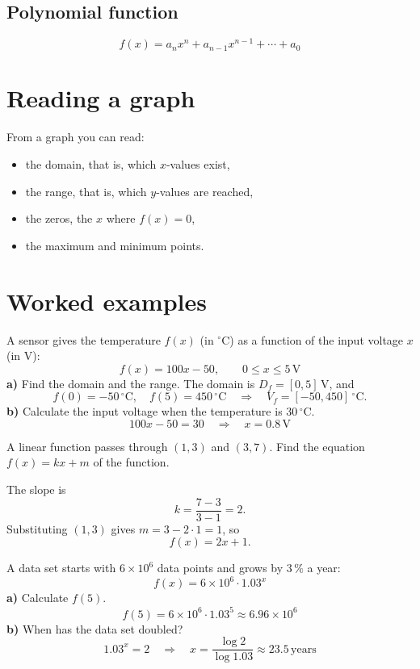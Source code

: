 \subsection{Polynomial function}
\label{c8:sec:polynom}
\[
  f(x) = a_n x^n + a_{n-1} x^{n-1} + \cdots + a_0
\]

\section{Reading a graph}
\label{c8:sec:graf}
From a graph you can read:
\begin{itemize}
  \item the domain, that is, which $x$-values exist,
  \item the range, that is, which $y$-values are reached,
  \item the zeros, the $x$ where $f(x) = 0$,
  \item the maximum and minimum points.
\end{itemize}

\section{Worked examples}
\label{c8:sec:typexempel}

\begin{exempel}
A sensor gives the temperature $f(x)$ (in $^{\circ}$C) as a function of the input voltage $x$ (in
V):
\[
  f(x) = 100x - 50, \qquad 0 \leq x \leq 5\,\text{V}
\]
\textbf{a)} Find the domain and the range. The domain is $D_f = [0, 5]\,\text{V}$, and
\[
  f(0) = -50\,^{\circ}\text{C}, \quad f(5) = 450\,^{\circ}\text{C}
  \quad \Rightarrow \quad V_f = [-50, 450]\,^{\circ}\text{C}.
\]
\textbf{b)} Calculate the input voltage when the temperature is $30\,^{\circ}\text{C}$.
\[
  100x - 50 = 30 \quad \Rightarrow \quad x = 0.8\,\text{V}
\]
\end{exempel}

\begin{exempel}
A linear function passes through $(1, 3)$ and $(3, 7)$. Find the equation $f(x) = kx + m$ of
the function.

The slope is
\[
  k = \frac{7 - 3}{3 - 1} = 2.
\]
Substituting $(1, 3)$ gives $m = 3 - 2 \cdot 1 = 1$, so
\[
  f(x) = 2x + 1.
\]
\end{exempel}

\begin{exempel}
A data set starts with $6 \times 10^6$ data points and grows by $3\,\%$ a year:
\[
  f(x) = 6 \times 10^6 \cdot 1.03^x
\]
\textbf{a)} Calculate $f(5)$.
\[
  f(5) = 6 \times 10^6 \cdot 1.03^5 \approx 6.96 \times 10^6
\]
\textbf{b)} When has the data set doubled?
\[
  1.03^x = 2 \quad \Rightarrow \quad x = \frac{\log 2}{\log 1.03} \approx 23.5\,\text{years}
\]
\end{exempel}
